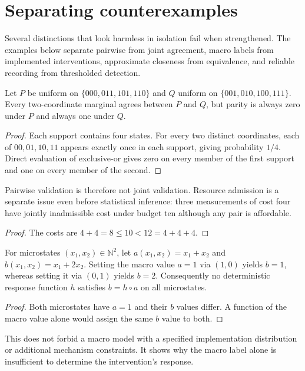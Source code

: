 \section{Separating counterexamples}\label{sec:separating-witnesses}

Several distinctions that look harmless in isolation fail when
strengthened. The examples below separate pairwise from joint
agreement, macro labels from implemented interventions, approximate
closeness from equivalence, and reliable recording from thresholded
detection.

\begin{theorem}
\label{thm:parity-marginals}
Let $P$ be uniform on $\{000,011,101,110\}$ and $Q$ uniform on
$\{001,010,100,111\}$. Every two-coordinate marginal agrees between
$P$ and $Q$, but parity is always zero under $P$ and always one under $Q$.
\end{theorem}
\begin{proof}
Each support contains four states. For every two distinct coordinates,
each of $00,01,10,11$ appears exactly once in each support, giving
probability $1/4$. Direct evaluation of exclusive-or gives zero on
every member of the first support and one on every member of the second.
\end{proof}
Pairwise validation is therefore not joint validation. Resource admission
is a separate issue even before statistical inference: three measurements
of cost four have jointly inadmissible cost under budget ten although any
pair is affordable.
\begin{proof}
The costs are $4+4=8\le10<12=4+4+4$.
\end{proof}

\begin{theorem}
\label{thm:macro-implementation}
For microstates $(x_1,x_2)\in\mathbb N^2$, let
$a(x_1,x_2)=x_1+x_2$ and $b(x_1,x_2)=x_1+2x_2$.
Setting the macro value $a=1$ via $(1,0)$ yields $b=1$, whereas
setting it via $(0,1)$ yields $b=2$. Consequently no deterministic
response function $h$ satisfies $b=h\circ a$ on all microstates.
\end{theorem}
\begin{proof}
Both microstates have $a=1$ and their $b$ values differ. A function
of the macro value alone would assign the same $b$ value to both.
\end{proof}
This does not forbid a macro model with a specified implementation
distribution or additional mechanism constraints. It shows why the macro
label alone is insufficient to determine the intervention's response.

